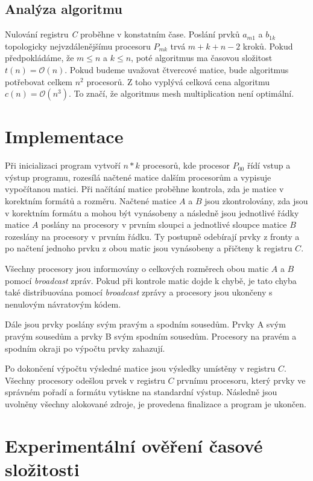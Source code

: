 \documentclass[11pt,a4paper]{article}
\begin{document}
\subsection{Analýza algoritmu}
Nulování registru \textit{C} proběhne v konstatním čase. Poslání prvků $a_{m1}$ a $b_{1k}$ topologicky nejvzdálenějšímu procesoru $P_{mk}$ trvá $m+k+n - 2$ kroků. Pokud předpokládáme, že $m \leq n$ a $k \leq n$, poté algoritmus ma časovou složitost $t(n) = \mathcal{O}(n)$. Pokud budeme uvažovat čtvercové matice, bude algoritmus potřebovat celkem $n^2$ procesorů. Z toho vyplývá celková cena algoritmu $c(n) = \mathcal{O}(n^3)$. To značí, že algoritmus mesh multiplication není optimální.

\section{Implementace}

Při inicializaci program vytvoří $n*k$ procesorů, kde procesor $P_{00}$ řídí vstup a výstup programu, rozesílá načtené matice dalším procesorům a vypisuje vypočítanou matici. Při načítání matice proběhne kontrola, zda je matice v korektním formátů a rozměru. Načtené matice $A$ a $B$ jsou zkontrolovány, zda jsou v korektním formátu a mohou být vynásobeny a následně jsou jednotlivé řádky matice $A$ poslány na procesory v prvním sloupci a jednotlivé sloupce matice $B$ rozeslány na procesory v prvním řádku. Ty postupně odebírají prvky z fronty a po načtení jednoho prvku z obou matic jsou vynásobeny a přičteny k registru $C$.

Všechny procesory jsou informovány o celkových rozměrech obou matic $A$ a $B$ pomocí \textit{broadcast} zpráv. Pokud při kontrole matic dojde k chybě, je tato chyba také distribuována pomocí \textit{broadcast} zprávy a procesory jsou ukončeny s nenulovým návratovým kódem.

Dále jsou prvky poslány svým pravým a spodním sousedům. Prvky A svým pravým sousedům a prvky B svým spodním sousedům. Procesory na pravém a spodním okraji po výpočtu prvky zahazují.

Po dokončení výpočtu výsledné matice jsou výsledky umístěny v registru $C$. Všechny procesory odešlou prvek v registru $C$ prvnímu procesoru, který prvky ve správném pořadí a formátu vytiskne na standardní výstup. Následně jsou uvolněny všechny alokované zdroje, je provedena finalizace a program je ukončen.

\section{Experimentální ověření časové složitosti}
\end{document}
